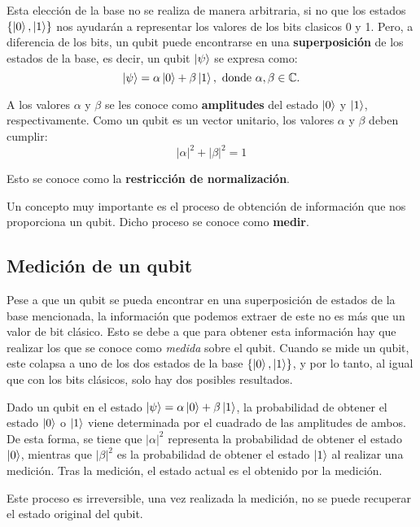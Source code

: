 Esta elección de la base no se realiza de manera arbitraria, si no que los estados $\{\left|0\right\rangle,\left|1\right\rangle\}$ nos ayudarán a representar los valores de los bits clasicos 0 y 1. Pero, a diferencia de los bits, un qubit puede encontrarse en una \textbf{superposición} de los estados de la base, es decir, un qubit $\left|\psi\right\rangle$ se expresa como:
\begin{equation}
\ket{\psi}=\alpha\ket0+\beta\ket1,\mathrm{\ donde\ }\alpha,\beta\in\C.
\end{equation}

A los valores $\alpha$ y $\beta$ se les conoce como \textbf{amplitudes} del estado $\left|0\right\rangle$ y $\left|1\right\rangle$, respectivamente. Como un qubit es un vector unitario, los valores $\alpha$ y $\beta$ deben cumplir:
\begin{equation}
|\alpha|^2 + |\beta|^2 = 1
\end{equation}

Esto se conoce como la \textbf{restricción de normalización}.

Un concepto muy importante es el proceso de obtención de información que nos proporciona un qubit. Dicho proceso se conoce como \textbf{medir}.

\subsection{Medición de un qubit}

Pese a que un qubit se pueda encontrar en una superposición de estados de la base mencionada, la información que podemos extraer de este no es más que un valor de bit clásico. Esto se debe a que para obtener esta información hay que realizar los que se conoce como \textit{medida} sobre el qubit. Cuando se mide un qubit, este colapsa a uno de los dos estados de la base $\{\left|0\right\rangle,\left|1\right\rangle\}$, y por lo tanto, al igual que con los bits clásicos, solo hay dos posibles resultados.

Dado un qubit en el estado $\left|\psi\right\rangle=\alpha\left|0\right\rangle+\beta\left|1\right\rangle$, la probabilidad de obtener el estado $\left|0\right\rangle$ o $\left|1\right\rangle$ viene determinada por el cuadrado de las amplitudes de ambos. De esta forma, se tiene que $|\alpha|^2$ representa la probabilidad de obtener el estado $\left|0\right\rangle$, mientras que $|\beta|^2$ es la probabilidad de obtener el estado $\left|1\right\rangle$ al realizar una medición. Tras la medición, el estado actual es el obtenido por la medición.

Este proceso es irreversible, una vez realizada la medición, no se puede recuperar el estado original del qubit.

